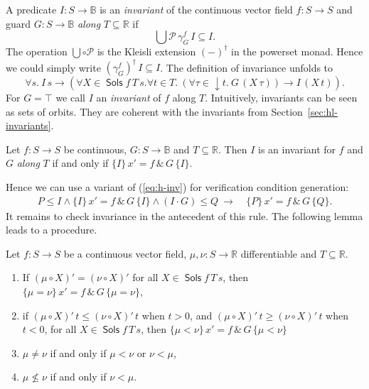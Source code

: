 \documentclass[envcountsame,envcountsect]{llncs}
\newcommand{\Pow}{\mathcal{P}}
\newcommand{\reals}{\mathbb{R}}
\newcommand{\bools}{\mathbb{B}}
\newcommand{\Sols}{\mathop{\mathsf{Sols}}}
\begin{document}
A predicate $I:S\to\bools$ is an \emph{invariant} of the continuous
vector field $f:S\to S$ and guard $G:S\to\bools$ \emph{along}
$T\subseteq \reals$ if
\begin{equation*}
\bigcup \Pow\, \gamma^f_G\, I\subseteq  I.
\end{equation*}
The operation $\bigcup\circ\Pow$ is the Kleisli extension $(-)^\dagger$
in the powerset monad. Hence we could simply write
$(\gamma^f_G)^\dagger\, I \subseteq I$. The definition of invariance
unfolds to
\begin{equation*}
  \forall s.\ I\, s \to (\forall X\in\Sols f\, T\, s.\forall t\in T.\ (\forall \tau\in {\downarrow}t.\ G\, (X\, \tau)) \to I\, (X\, t)).
\end{equation*}
For $G=\top$ we call $I$ an \emph{invariant} of $f$ along $T$.
Intuitively, invariants can be seen as sets of orbits. They are
coherent with the invariants from
Section~\ref{sec:hl-invariants}.
\begin{proposition}\label{P:inv-prop}
  Let $f:S\to S$ be continuous, $G:S\to\bools$ and
  $T\subseteq \reals$. Then $I$ is an invariant for $f$ and $G$ \emph{along} $T$ if and only if
$ \{I\}\, x' = f\, \&\, G\, \{I\}$.
\end{proposition}
Hence we can use a variant of (\ref{eq:h-inv}) for verification condition generation:
\begin{align}
  P\le I \land \{I\}\, x' = f\, \&\, G\, \{I\}\land (I\cdot G)\le Q\ \rightarrow\
  &\{P\}\, x' = f\, \&\, G\, \{Q\}.\label{eq:h-invg}\tag{h-invg}
\end{align}
It remains to check invariance in the antecedent of this rule. The
following lemma leads to a procedure.

\begin{lemma}\label{P:invrules}
  Let $f:S\to S$ be a continuous vector field, $\mu,\nu:S\to\reals$
  differentiable and $T\subseteq \reals$. 
\begin{enumerate}
\item If $(\mu\circ X)' =(\nu\circ X)'$ for all
  $X\in \Sols f\, T\, s$, then $\{\mu=\nu\}\, x' = f\, \&\, G\, \{\mu=\nu\}$, 
\item if $(\mu\circ X)'\, t\leq(\nu\circ X)'\, t$ when $t> 0$, and $(\mu\circ X)'\, t\geq(\nu\circ X)'\, t$ when $t< 0$, for all $X\in \Sols f\, T\, s$,
  then $\{\mu <\nu\}\, x' = f\, \&\, G\, \{\mu <\nu\}$
\item $\mu\neq \nu$ if and only if $\mu < \nu$ or $\nu < \mu$,
\item $\mu \not\le \nu$ if and only if $\nu < \mu$.
\end{enumerate}
\end{lemma}
\end{document}
